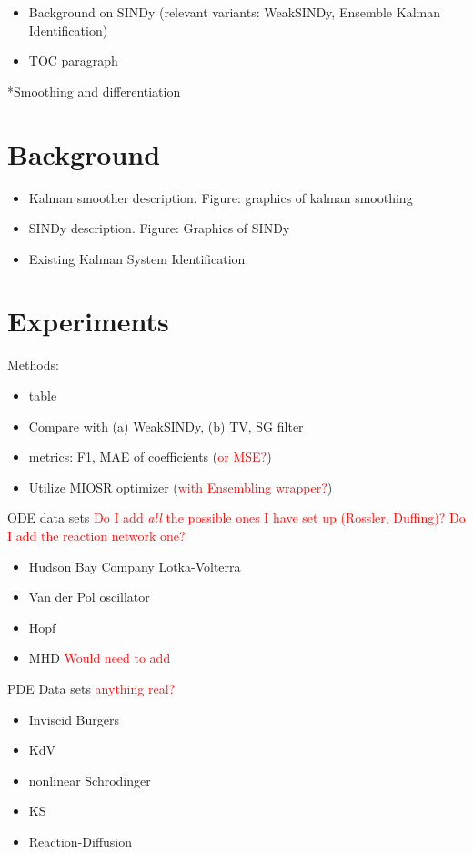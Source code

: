 \documentclass{article}[letterpaper]
\begin{document}
\begin{itemize}
    \item Background on SINDy (relevant variants: WeakSINDy, Ensemble Kalman Identification)
    \item TOC paragraph
\end{itemize}
*Smoothing and differentiation
\section{Background}
\begin{itemize}
    \item Kalman smoother description.  Figure: graphics of kalman smoothing
    \item SINDy description.  Figure: Graphics of SINDy
    \item Existing Kalman System Identification.
\end{itemize}
\section{Experiments}
Methods:
\begin{itemize}
    \item table
    \item Compare with (a) WeakSINDy, (b) TV, SG filter
    \item metrics: F1, MAE of coefficients (\textcolor{red}{or MSE?})
    \item Utilize MIOSR optimizer (\textcolor{red}{with Ensembling wrapper?})
\end{itemize}
ODE data sets \textcolor{red}{Do I add {\it all} the possible ones I have set up (Rossler, Duffing)?  Do I add the reaction network one?}
\begin{itemize}
    \item Hudson Bay Company Lotka-Volterra
    \item Van der Pol oscillator
    \item Hopf
    \item MHD \textcolor{red}{Would need to add}
\end{itemize}
PDE Data sets \textcolor{red}{anything real?}
\begin{itemize}
    \item Inviscid Burgers
    \item KdV
    \item nonlinear Schrodinger
    \item KS
    \item Reaction-Diffusion
\end{itemize}
\end{document}
